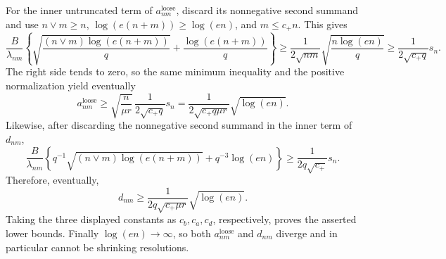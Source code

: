 For the inner untruncated term of \(a^{\mathrm{loose}}_{nm}\), discard its nonnegative second summand and use \(n\vee m\ge n\), \(\log(e(n+m))\ge\log(en)\), and \(m\le c_+n\).  This gives
\[
 \frac B{\lambda_{nm}}
 \left\{
 \sqrt{\frac{(n\vee m)\log(e(n+m))}{q}}
 +\frac{\log(e(n+m))}{q}
 \right\}
 \ge
 \frac1{2\sqrt{nm}}
 \sqrt{\frac{n\log(en)}q}
 \ge\frac1{2\sqrt{c_+q}}s_n.
\]
The right side tends to zero, so the same minimum inequality and the positive normalization yield eventually
\[
 a^{\mathrm{loose}}_{nm}
 \ge\sqrt{\frac n{\mu r}}\,\frac1{2\sqrt{c_+q}}s_n
 =\frac1{2\sqrt{c_+q\mu r}}\sqrt{\log(en)}.
\]
Likewise, after discarding the nonnegative second summand in the inner term of \(d_{nm}\),
\[
 \frac B{\lambda_{nm}}
 \left\{
 q^{-1}\sqrt{(n\vee m)\log(e(n+m))}
 +q^{-3}\log(en)
 \right\}
 \ge\frac1{2q\sqrt{c_+}}s_n.
\]
Therefore, eventually,
\[
 d_{nm}\ge
 \frac1{2q\sqrt{c_+\mu r}}\sqrt{\log(en)}.
\]
Taking the three displayed constants as \(c_b,c_a,c_d\), respectively, proves the asserted lower bounds.  Finally \(\log(en)\to\infty\), so both \(a^{\mathrm{loose}}_{nm}\) and \(d_{nm}\) diverge and in particular cannot be shrinking resolutions.
